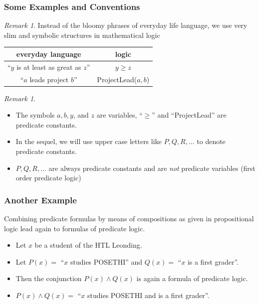 \documentclass{beamer}
\theoremstyle{remark}
\newtheorem{remark}[theorem]{Remark}
\begin{document}
\begin{frame}
\frametitle{Some Examples and Conventions}
\begin{remark}
Instead of the bloomy phrases of everyday life language, we use very slim and symbolic structures in mathematical logic
\end{remark}
\pause
\begin{example}
\begin{tabular}{|c|c|}
\hline
everyday language & logic \\ \hline
``$y$ is at least as great as $z$'' & $y \geq z$ \\
``$a$ leads project $b$'' & ProjectLead($a, b$) \\ \hline
 \end{tabular}
\end{example}
 \pause
\begin{remark}
\begin{itemize}
	\item The symbols $a, b, y$, and $z$ are variables, ``$\geq$'' and ``ProjectLead'' are predicate constants.
	\pause
	\item In the sequel, we will use upper case letters like $P, Q, R, \ldots$ to denote predicate constants.
	\pause
	\item $P, Q, R, \ldots$ are always predicate constants and are {\em not} predicate variables (first order predicate logic)
\end{itemize}
\end{remark}
\end{frame}

\begin{frame}
\frametitle{Another Example}
Combining predicate formulas by means of compositions as given in propositional logic lead again to formulas of predicate logic.
\pause
\begin{example}
\begin{itemize}
	\item Let $x$ be a student of the HTL Leonding.
	\pause
	\item Let $P(x) = $ ``$x$ studies POSETHI'' and $Q(x) = $ ``$x$ is a first grader''.
	\pause
	\item Then the conjunction $P(x) \land Q(x)$ is again a formula of predicate logic.
	\pause
	\item $P(x) \land Q(x) = $ ``$x$ studies POSETHI and is a first grader''.
\end{itemize}

\end{example}
\end{frame}
\end{document}
